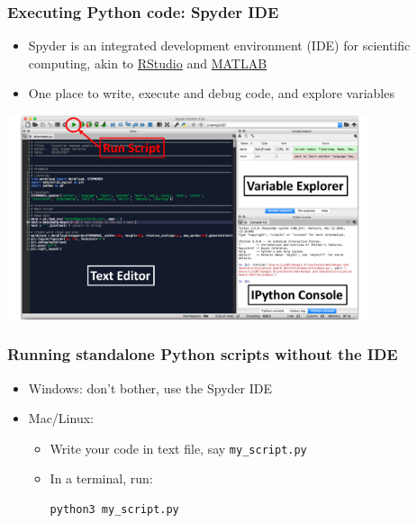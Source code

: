 \documentclass[xcolor=table]{beamer}
\begin{document}
\begin{frame}[fragile]
\frametitle{Executing Python code: Spyder IDE}
\begin{itemize}\addtolength{\itemsep}{.7\baselineskip}
	\item Spyder is an integrated development environment (IDE) for scientific computing, akin to \href{https://www.rstudio.com/}{RStudio} and \href{https://uk.mathworks.com/products/matlab.html}{MATLAB} 
	\item One place to write, execute and debug code, and explore variables
\end{itemize}

\begin{center}
\includegraphics[width=0.8\textwidth]{spyder_annotated.pdf}
\end{center}
\end{frame}

\begin{frame}[fragile]
\frametitle{Running standalone Python scripts without the IDE}
\begin{itemize}
    \item Windows: don't bother, use the Spyder IDE
        \pause
    \item Mac/Linux: 
        \begin{itemize}
            \item Write your code in text file, say \texttt{my\_script.py}
                \pause
            \item In a terminal, run:
\begin{lstlisting}[style=bash]
python3 my_script.py
\end{lstlisting}
        \end{itemize}
\end{itemize}

\end{frame}
\end{document}
